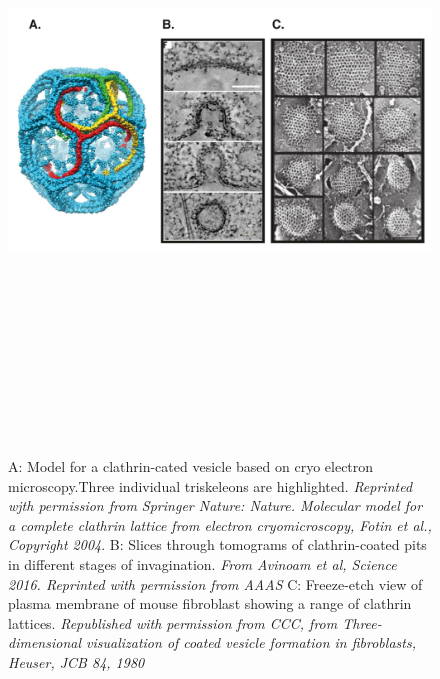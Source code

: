 \begin{figure}[H]
\hspace*{-0.6cm}
	\includegraphics[width=14cm, height=17cm, keepaspectratio]{figures/intro/clathrin}
	\caption[Endocytic pathways in cells]
	{ A: Model for a clathrin-cated vesicle based on cryo electron microscopy.Three individual triskeleons are highlighted. \textit{Reprinted wjth permission from Springer Nature: Nature. Molecular model for a complete clathrin lattice from electron cryomicroscopy,  Fotin et al., Copyright 2004}.
		B:   Slices through tomograms of clathrin-coated pits in different stages of invagination. \textit{From Avinoam et al, Science 2016. Reprinted with permission from AAAS}
		C: Freeze-etch view of plasma membrane of mouse fibroblast showing a range of clathrin lattices. \textit{Republished with permission from CCC, from Three-dimensional visualization of coated vesicle formation in fibroblasts, Heuser, JCB 84, 1980 }
		\label{intro_clathrin}}
\end{figure}

